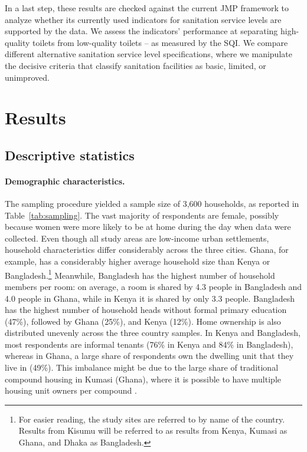 \documentclass[natbib]{svjour3}                     %
\begin{document}
In a last step, these results are checked against the current JMP framework to analyze whether its currently used indicators for sanitation service levels are supported by the data. We assess the indicators’ performance at separating high-quality toilets from low-quality toilets -- as measured by the SQI. We compare different alternative sanitation service level specifications, where we manipulate the decisive criteria that classify sanitation facilities as basic, limited, or unimproved. 

\FloatBarrier
\section{Results}
\label{sec:results}

\subsection{Descriptive statistics}
\paragraph{Demographic characteristics.}
The sampling procedure yielded a sample size of 3,600 households, as reported in Table~\ref{tab:sampling}. The vast majority of respondents are female, possibly because women were more likely to be at home during the day when data were collected. Even though all study areas are low-income urban settlements, household characteristics differ considerably across the three cities. Ghana, for example, has a considerably higher average household size than Kenya or Bangladesh.\footnote{For easier reading, the study sites are referred to by name of the country. Results from Kisumu will be referred to as results from Kenya, Kumasi as Ghana, and Dhaka as Bangladesh.} Meanwhile, Bangladesh has the highest number of household members per room: on average, a room is shared by 4.3 people in Bangladesh and 4.0 people in Ghana, while in Kenya it is shared by only 3.3 people. Bangladesh has the highest number of household heads without formal primary education (47\%), followed by Ghana (25\%), and Kenya (12\%). Home ownership is also distributed unevenly across the three country samples. In Kenya and Bangladesh, most respondents are informal tenants (76\% in Kenya and 84\% in Bangladesh), whereas in Ghana, a large share of respondents own the dwelling unit that they live in (49\%). This imbalance might be due to the large share of traditional compound housing in Kumasi (Ghana), where it is possible to have multiple housing unit owners per compound \citep{Tipple2011}.  
\end{document}
